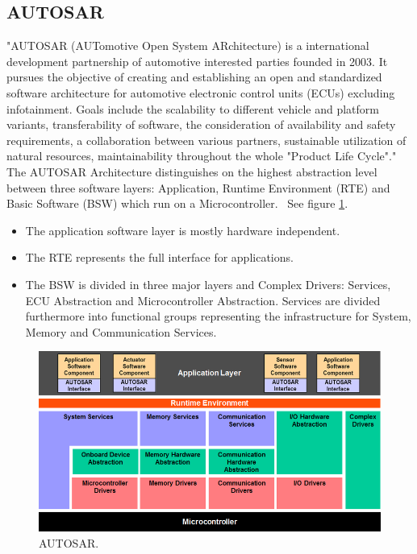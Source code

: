 \subsection{AUTOSAR}
"AUTOSAR (AUTomotive Open System ARchitecture) is a international development partnership of automotive interested parties founded in 2003. It pursues the objective of creating and establishing an open and standardized software architecture for automotive electronic control units (ECUs) excluding infotainment. Goals include the scalability to different vehicle and platform variants, transferability of software, the consideration of availability and safety requirements, a collaboration between various partners, sustainable utilization of natural resources, maintainability throughout the whole "Product Life Cycle"."~\cite{website:autosar}\\

The AUTOSAR Architecture distinguishes on the highest abstraction level between three software layers: Application, Runtime Environment (RTE) and Basic Software (BSW) which run on a Microcontroller.~\cite{website:autosar} See figure \ref{fig:autosar}.
\begin{itemize}
\item The application software layer is mostly hardware independent.
\item The RTE represents the full interface for applications.
\item The BSW is divided in three major layers and Complex Drivers: Services, ECU Abstraction and Microcontroller Abstraction. Services are divided furthermore into functional groups representing the infrastructure for System, Memory and Communication Services.
\end{itemize}

\begin{figure}[H]
\centering
\includegraphics[width=\textwidth]{./img/literature_autosar.png}
\caption{AUTOSAR.~\cite{website:autosar}}\label{fig:autosar}
\end{figure}

